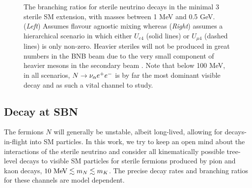 \documentclass[11pt, a4paper]{article}
\newcommand{\reffig}[1]{Fig.~\ref{#1}}
\def\ster{\ensuremath N}
\begin{document}
\begin{figure}[t]
\caption{\label{fig:branchingratios}The branching ratios for sterile neutrino
decays in the minimal 3 sterile SM extension, with masses between 1 MeV and 0.5
GeV. (\emph{Left}) Assumes flavour agnostic mixing whereas (\emph{Right}) assumes a
hierarchical scenario in which either $U_{e4}$ (solid lines) or $U_{\mu 4}$
(dashed lines) is only non-zero. Heavier steriles will not be produced in great
numbers in the BNB beam due to the very small component of heavier mesons in
the secondary beam \cite{AguilarArevalo:2008yp}. Note that below 100 MeV, in
all scenarios, $\ster \rightarrow \nu_\alpha e^+ e^-$ is by far the most
dominant visible decay and as such a vital channel to study.}

\end{figure}
%

\subsection{Decay at SBN}

The fermions $N$ will generally be unstable, albeit long-lived, allowing
for decays-in-flight into SM particles. In this work, we try to keep an open
mind about the interactions of the sterile neutrino and consider all
kinematically possible tree-level decays to visible SM particles for sterile
fermions produced by pion and kaon decays, $10~\text{MeV}\lesssim m_{\ster}
\lesssim m_K$. The precise decay rates and branching ratios for these channels
are model dependent. 
%

%
%
%
%
\end{document}
